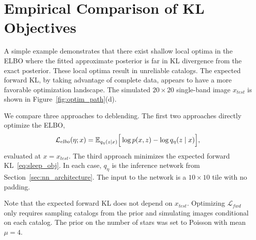 \section{Empirical Comparison of KL Objectives}


\label{sec:elbo_sleep_compare}

A simple example demonstrates that there exist shallow local optima in the ELBO
where the fitted approximate posterior is far in KL divergence from the exact posterior.
These local optima result in unreliable catalogs.
The expected forward KL, by taking advantage of complete data, appears to have a more favorable optimization landscape.
The simulated $20\times20$ single-band image $x_{test}$ is shown in Figure~\ref{fig:optim_path}(d).

We compare three approaches to deblending. The first two approaches directly optimize the ELBO,
\begin{align}
\mathcal{L}_{elbo}(\eta; x) = \mathbb{E}_{q_{\eta}(z \mid x)}\Big[\log p(x, z) - \log q_{\eta}(z \mid x)\Big],
\label{eq:elbo_on_test}
\end{align}
evaluated at $x = x_{test}$. 
The third approach minimizes the expected forward KL~\eqref{eq:sleep_obj}.
In each case, $q_\eta$ is the inference network from Section~\ref{sec:nn_architecture}.
The input to the network is a $10\times 10$ tile with no padding.

Note that the expected forward KL does not depend on $x_{test}$.
Optimizing $\mathcal{L}_{fwd}$ only requires sampling catalogs from the prior
and simulating images conditional on each catalog.
The prior on the number of stars was set to Poisson with mean $\mu = 4$.

